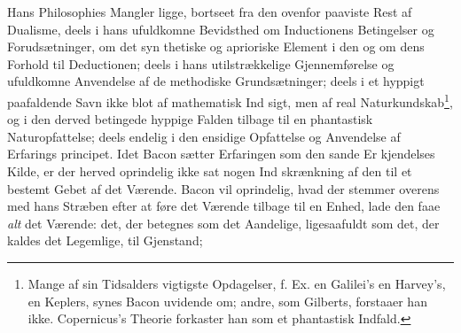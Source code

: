 \documentclass[12pt,a4paper]{book}
\begin{document}
Hans Philosophies Mangler ligge, bortseet fra den ovenfor
paaviste Rest af Dualisme, deels i hans ufuldkomne Bevidsthed
om Inductionens Betingelser og Forudsætninger, om det syn\-%
thetiske og aprioriske Element i den og om dens Forhold til
Deductionen; deels i hans utilstrækkelige Gjennemførelse og
ufuldkomne Anvendelse af de methodiske Grundsætninger; deels
i et hyppigt paafaldende Savn ikke blot af mathematisk Ind\-%
sigt, men af real Naturkundskab\footnote{Mange af sin Tidsalders vigtigste Opdagelser, f. Ex. en Galilei's
en Harvey's, en Keplers, synes Bacon uvidende om; andre, som
Gilberts, forstaaer han ikke. Copernicus's Theorie forkaster han som
et phantastisk Indfald.}, og i den derved betingede
hyppige Falden tilbage til en phantastisk Naturopfattelse; deels
endelig i den ensidige Opfattelse og Anvendelse af Erfarings\-%
principet. Idet Bacon sætter Erfaringen som den sande Er\-%
kjendelses Kilde, er der herved oprindelig ikke sat nogen Ind\-%
skrænkning af den til et bestemt Gebet af det Værende.
Bacon vil oprindelig, hvad der stemmer overens med hans
Stræben efter at føre det Værende tilbage til en Enhed, lade den
faae \emph{alt} det Værende: det, der betegnes som det Aandelige,
ligesaafuldt som det, der kaldes det Legemlige, til Gjenstand;
\setcounter{footnote}{0}%
\end{document}
